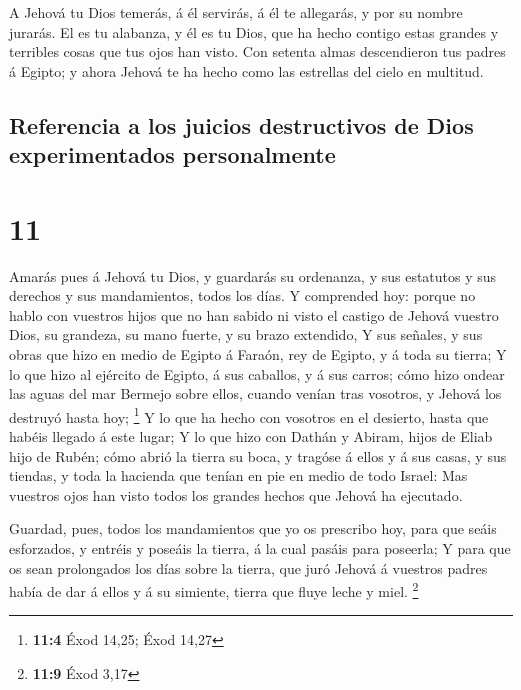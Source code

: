  A Jehová tu Dios temerás, á él servirás, á él te
allegarás, y por su nombre jurarás.  El es tu alabanza, y
él es tu Dios, que ha hecho contigo estas grandes y terribles cosas que
tus ojos han visto.  Con setenta almas descendieron tus
padres á Egipto; y ahora Jehová te ha hecho como las estrellas del cielo
en multitud.

\hypertarget{referencia-a-los-juicios-destructivos-de-dios-experimentados-personalmente}{%
\subsection{Referencia a los juicios destructivos de Dios experimentados
personalmente}\label{referencia-a-los-juicios-destructivos-de-dios-experimentados-personalmente}}

\hypertarget{section-10}{%
\section{11}\label{section-10}}

 Amarás pues á Jehová tu Dios, y guardarás su ordenanza, y
sus estatutos y sus derechos y sus mandamientos, todos los días.
 Y comprended hoy: porque no hablo con vuestros hijos que no
han sabido ni visto el castigo de Jehová vuestro Dios, su grandeza, su
mano fuerte, y su brazo extendido,  Y sus señales, y sus
obras que hizo en medio de Egipto á Faraón, rey de Egipto, y á toda su
tierra;  Y lo que hizo al ejército de Egipto, á sus
caballos, y á sus carros; cómo hizo ondear las aguas del mar Bermejo
sobre ellos, cuando venían tras vosotros, y Jehová los destruyó hasta
hoy; \footnote{\textbf{11:4} Éxod 14,25; Éxod 14,27}  Y lo
que ha hecho con vosotros en el desierto, hasta que habéis llegado á
este lugar;  Y lo que hizo con Dathán y Abiram, hijos de
Eliab hijo de Rubén; cómo abrió la tierra su boca, y tragóse á ellos y á
sus casas, y sus tiendas, y toda la hacienda que tenían en pie en medio
de todo Israel:  Mas vuestros ojos han visto todos los
grandes hechos que Jehová ha ejecutado.

 Guardad, pues, todos los mandamientos que yo os prescribo
hoy, para que seáis esforzados, y entréis y poseáis la tierra, á la cual
pasáis para poseerla;  Y para que os sean prolongados los
días sobre la tierra, que juró Jehová á vuestros padres había de dar á
ellos y á su simiente, tierra que fluye leche y miel. \footnote{\textbf{11:9}
  Éxod 3,17}

